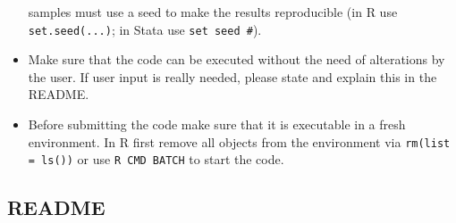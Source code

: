 \documentclass[12pt,a4paper]{article}
\begin{document}
\begin{itemize}
  samples {must} use a seed to make the results reproducible (in \textsf{R} use
  \texttt{set.seed(...)}; in \textsf{Stata} use \texttt{set seed \#}).
\item Make sure that the code can be executed without the need of alterations by
  the user. If user input is really needed, please state and explain this in the
  README.
\item Before submitting the code make sure that it is executable in a fresh
  environment. In \textsf{R} first remove all objects from the environment via
  \texttt{rm(list = ls())} or use \texttt{R CMD BATCH} to start the code.
\end{itemize}

\subsection{README}
\end{document}
